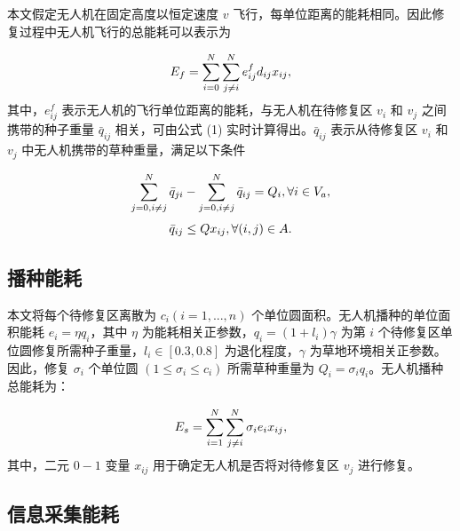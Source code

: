 \documentclass[AutoFakeBold]{LZUThesis}
\begin{document}
本文假定无人机在固定高度以恒定速度 $v$ 飞行，每单位距离的能耗相同。因此修复过程中无人机飞行的总能耗可以表示为

\begin{equation} \label{flight-energy}
	\begin{scriptsize}
		E_f =  \sum^N_{i=0}\sum^N_{j \neq i} e^f_{ij} d_{ij} x_{ij},
	\end{scriptsize}
\end{equation}
其中，$e^f_{ij}$ 表示无人机的飞行单位距离的能耗，与无人机在待修复区 $v_i$ 和 $v_j$ 之间携带的种子重量 $\bar{q}_{ij}$ 相关，可由公式 (1) 实时计算得出。$\bar{q}_{ij}$ 表示从待修复区 $v_i$ 和 $v_j$ 中无人机携带的草种重量，满足以下条件

\begin{equation} \label{remained-weight}
	\begin{scriptsize}
		\sum^N_{j=0, i\neq j}\bar{q}_{ji} -  \sum^N_{j=0, i\neq j}\bar{q}_{ij} = Q_i, \forall i \in V_a,
	\end{scriptsize}
\end{equation}
\begin{equation} \label{demanded-weight}
	\begin{small}
		\bar{q}_{ij} \leq Q x_{ij}, \forall (i,j) \in A.
	\end{small}
\end{equation}

\subsection{播种能耗}

本文将每个待修复区离散为 $c_i(i = 1, ..., n)$ 个单位圆面积。无人机播种的单位面积能耗 $e_i = \eta q_i$，其中 $\eta$ 为能耗相关正参数，$q_i = (1 + l_i) \gamma$ 为第 $i$ 个待修复区单位圆修复所需种子重量，$l_i \in [0.3, 0.8]$ 为退化程度，$\gamma$ 为草地环境相关正参数。因此，修复 $\sigma_i$ 个单位圆 $(1\leq\sigma_i\leq c_i)$ 所需草种重量为 $Q_i = \sigma_i q_i$。无人机播种总能耗为：

\begin{equation} \label{seeding-energy}
	\begin{small}
		E_s = \sum^N_{i = 1}\sum^N_{j \neq i}\sigma_i e_i x_{ij},
	\end{small}
\end{equation}
其中，二元 $0-1$ 变量 $x_{ij}$ 用于确定无人机是否将对待修复区 $v_j$ 进行修复。


\subsection{信息采集能耗}
\end{document}
